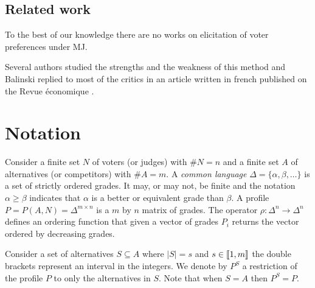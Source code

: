 \documentclass[version=3.21, pagesize, twoside=off, bibliography=totoc, DIV=calc, fontsize=12pt, a4paper]{scrartcl}
\begin{document}
\subsection{Related work}

To the best of our knowledge there are no works on elicitation of voter preferences under \acs{MJ}.

Several authors studied the strengths and the weakness of this method \citep{Felsenthal2008,Laslier2018} and Balinski replied to most of the critics in an article written in french published on the Revue économique \citep{Balinski2019}.




\section{Notation}
\label{sec:complete}
Consider a finite set $N$ of voters (or judges) with $\#N=n$ and a finite set $A$ of alternatives (or competitors) with $\#A=m$. 
A \textit{common language} $\Delta = \{ \alpha, \beta, \dots \}$ is a set of strictly ordered grades. It may, or may not, be finite and the notation $\alpha \geq \beta$ indicates that $\alpha$ is a better or equivalent grade than $\beta$. A profile $P = P(A,N) = \Delta^{m \times n}$ is a $m$ by $n$ matrix of grades. The operator $\rho: \Delta^{n} \rightarrow \Delta^n$ defines an ordering function that given a vector of grades $P_i$ returns the vector ordered by decreasing grades.

Consider a set of alternatives $S\subseteq A$ where $|S|=s$ and $s \in \llbracket1,m\rrbracket$ \textemdash the double brackets represent an interval in the integers. We denote by $P^S$ a restriction of the profile $P$ to only the alternatives in $S$. Note that when $S=A$ then $P^S=P$.
\end{document}
